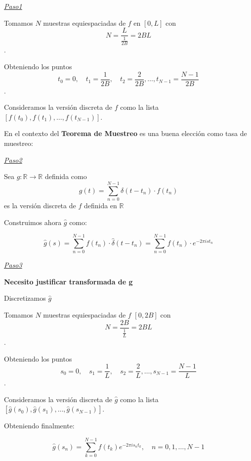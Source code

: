 \vspace{0.9mm}
\underline{\textit{Paso1}}

Tomamos $N$ muestras equiespaciadas de $f$  en $[0,L]$ con \[ N = \frac{L}{\frac{1}{2B}} = 2BL \].

Obteniendo  los puntos
\[ t_0 = 0, \quad t_1 = \frac{1}{2B}, \quad t_2 = \frac{2}{2B}, \ldots, t_{N-1} = \frac{N-1}{2B} \].

Consideramos la versión discreta de \( f \) como la lista \( [f(t_0), f(t_1), \ldots, f(t_{N-1})] \). 






En el contexto del \textbf{Teorema de Muestreo} es una buena elección como tasa de muestreo:

\vspace{1.5cm}


\noindent \underline{\textit{Paso2}}

\noindent Sea \( g: \mathbb{R} \rightarrow \mathbb{R} \) definida como 
\begin{equation}
    g(t) = \sum_{n=0}^{N-1} \delta(t - t_n) \cdot f(t_n)
\end{equation} 
 es la versión discreta de $f$ definida en $\mathbb{R}$ 

Construimos ahora $\widehat{g}$ como: 

\begin{equation}
    \widehat{g}(s) = \sum_{n=0}^{N-1} f(t_n)  \cdot \widehat{\delta}(t - t_n) = \sum_{n=0}^{N-1} f(t_n)  \cdot  e^{-2\pi i s t_n}
\end{equation}

\underline{\textit{Paso3}}
\vspace{1.0mm}

\textbf{Necesito justificar transformada de g}

Discretizamos $\widehat{g}$

Tomamos $N$ muestras equiespaciadas de $f$  $[0,2B]$ con \[ N = \frac{2B}{\frac{1}{L}} = 2BL \].

Obteniendo  los puntos
\[ s_0 = 0, \quad s_1 = \frac{1}{L}, \quad s_2 = \frac{2}{L}, \ldots, s_{N-1} = \frac{N-1}{L} \].

Consideramos la versión discreta de \( \widehat{g} \) como la lista \( [\widehat{g} (s_0), \widehat{g} (s_1), \ldots, \widehat{g} (s_{N-1})] \). 

Obteniendo finalmente:

\begin{equation}
    \widehat{g}(s_n) = \sum_{k=0}^{N-1} f(t_k) e^{-2\pi i s_n t_k}, \quad n = 0,1,\ldots,N-1
\end{equation}



